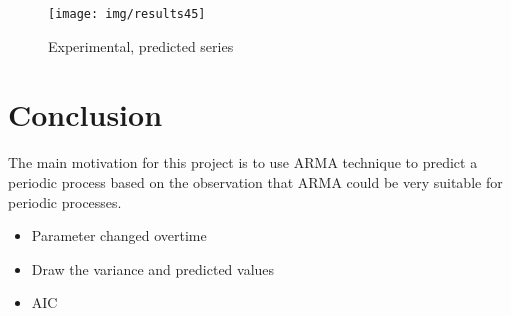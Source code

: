 \documentclass[12pt]{article}
\begin{document}


\begin{figure}[ht!]
\centering
\texttt{[image: img/results45]}
\caption{Experimental, predicted series}\label{fig:results45}
\end{figure}

\section{Conclusion}
The main motivation for this project is to use ARMA technique to predict a
periodic process based on the observation that ARMA could be very suitable for
periodic processes.
\begin{itemize}
  \item Parameter changed overtime
  \item Draw the variance and predicted values
  \item AIC
\end{itemize}



\end{document}
